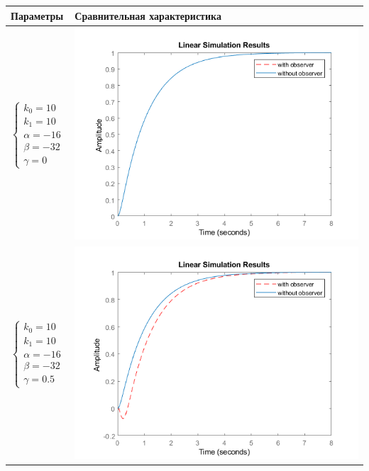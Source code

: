 \begin{longtable}{ | m{2cm} | m{10cm} | }
		\hline
		Параметры & Сравнительная характеристика \\ \hline
		
		$\begin{cases} k_0=10 \\ k_1=10 \\ \alpha=-16 \\ \beta= -32 \\ \gamma=0 \end{cases}$ &

		\begin{minipage}{.3\textwidth}
			\includegraphics[scale = 0.6]{images/e1.png}
		\end{minipage}
		\\\hline
		
		$\begin{cases} k_0=10 \\ k_1=10 \\ \alpha=-16 \\ \beta= -32 \\ \gamma=0.5 \end{cases}$ &

		\begin{minipage}{.3\textwidth}
			\includegraphics[scale = 0.6]{images/e2.png}
		\end{minipage}
		\\\hline
		

\end{longtable}
